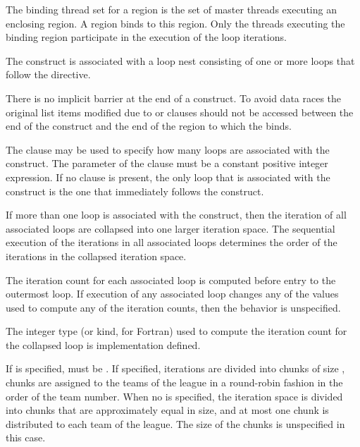 \begin{samepage}

\binding
The binding thread set for a  region is the set of master
threads executing an enclosing  region. A  region
binds to this  region. Only the threads executing the binding  region participate in the 
execution of the loop iterations.

\descr
The  construct is associated with a loop nest consisting of one or more 
loops that follow the directive.

There is no implicit barrier at the end of a  construct.
To avoid data races the original
list items modified due to  or  clauses
should not be accessed between the end of the  construct and the end
of the  region to which the  binds.

\end{samepage}

The  clause may be used to specify how many loops are associated with the 
 construct. The parameter of the  clause must be a constant 
positive integer expression. If no  clause is present, the only loop that is 
associated with the  construct is the one that immediately follows the 
 construct.

If more than one loop is associated with the  construct, then the iteration 
of all associated loops are collapsed into one larger iteration space. The sequential 
execution of the iterations in all associated loops determines the order of the iterations in 
the collapsed iteration space.

The iteration count for each associated loop is computed before entry to the outermost loop. If execution of any associated loop changes any of the values used to compute any of the iteration counts, then the behavior is unspecified. 

The integer type (or kind, for Fortran) used to compute the iteration count for the collapsed loop is implementation defined.

If  is specified,  must be . If specified, iterations are 
divided into chunks of size , chunks are assigned to the teams of the league in 
a round-robin fashion in the order of the team number. When no  is specified, 
the iteration space is divided into chunks that are approximately equal in size, and at 
most one chunk is distributed to each team of the league. The size of the 
chunks is unspecified in this case.

